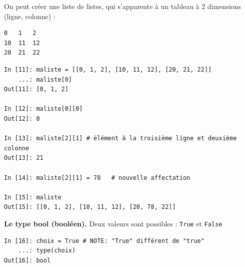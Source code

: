 \documentclass{beamer}
\begin{document}
\begin{frame}

On peut créer une liste de listes, qui s'apparente à un tableau à 2 dimensions (ligne, colonne) :

\begin{Verbatim}[numbers=none,fontsize=\fontsize{9pt}{9pt},baselinestretch=0.95]
0   1   2
10  11  12
20  21  22
\end{Verbatim}

\begin{verbatim}
In [11]: maliste = [[0, 1, 2], [10, 11, 12], [20, 21, 22]]
    ...: maliste[0]
Out[11]: [0, 1, 2]

In [12]: maliste[0][0]
Out[12]: 0

In [13]: maliste[2][1] # élément à la troisième ligne et deuxième colonne
Out[13]: 21

In [14]: maliste[2][1] = 78   # nouvelle affectation

In [15]: maliste
Out[15]: [[0, 1, 2], [10, 11, 12], [20, 78, 22]]
\end{verbatim}
\end{frame}

\begin{frame}

\noindent\textbf{Le type bool (booléen).}
Deux valeurs sont possibles : \texttt{True} et \texttt{False}

\begin{verbatim}
In [16]: choix = True # NOTE: "True" différent de "true"
    ...: type(choix)
Out[16]: bool
\end{verbatim}
\end{frame}
\end{document}
